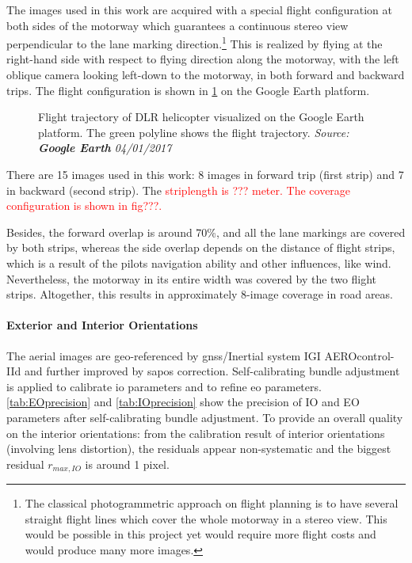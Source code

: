 The images used in this work are acquired with a special flight configuration at both sides of the motorway which guarantees a continuous stereo view perpendicular to the lane marking direction.\footnote{The classical photogrammetric approach on flight planning is to have several straight flight lines which cover the whole motorway in a stereo view. This would be possible in this project yet would require more flight costs and would produce many more images.} This is realized by flying at the right-hand side with respect to flying direction along the motorway, with the left oblique camera looking left-down to the motorway, in both forward and backward trips. The flight configuration is shown in \cref{fig:FlightTrajectory} on the Google Earth platform.

\begin{figure}%
	\centering
	\caption{\small Flight trajectory of DLR helicopter visualized on the Google Earth platform. The green polyline shows the flight trajectory. \textit{Source: \textbf{Google Earth} 04/01/2017}}
	\label{fig:FlightTrajectory}
\end{figure}

\clearpage
There are 15 images used in this work: 8 images in forward trip (first strip) and 7 in backward (second strip). The \textcolor{red}{striplength is ??? meter. The coverage configuration is shown in fig???.}

Besides, the forward overlap is around 70\%, and all the lane markings are covered by both strips, whereas the side overlap depends on the distance of flight strips, which is a result of the pilots navigation ability and other influences, like wind. Nevertheless, the motorway in its entire width was covered by the two flight strips. Altogether, this results in approximately 8-image coverage in road areas. 


\paragraph{Exterior and Interior Orientations}
The aerial images are geo-referenced by \gls{gnss}/Inertial system IGI AEROcontrol-IId and further improved by \gls{sapos} correction. Self-calibrating bundle adjustment is applied to calibrate \gls{io} parameters and to refine \gls{eo} parameters. \cref{tab:EOprecision} and \cref{tab:IOprecision} show the precision of IO and EO parameters after self-calibrating bundle adjustment. %
To provide an overall quality on the interior orientations: from the calibration result of interior orientations (involving lens distortion), the residuals appear non-systematic and the biggest residual $r_{max, IO}$ is around 1 pixel.%

